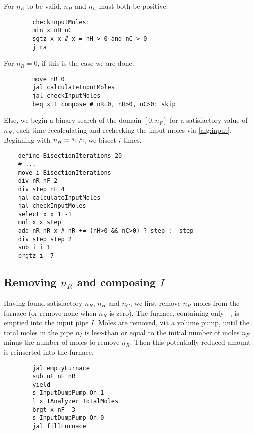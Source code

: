 \documentclass{article}
\DeclareMathOperator{\CDiox}{\mathrm{CO}_2}
\begin{document}
\begin{multicols}{2}
    \noindent
    For $n_R$ to be valid, $n_H$ and $n_C$ must both be positive.
    \columnbreak
    \begin{verbatim}
        checkInputMoles:
        min x nH nC
        sgtz x x # x = nH > 0 and nC > 0
        j ra
    \end{verbatim}
\end{multicols}
\begin{multicols}{2}
    \noindent
    For $n_R=0$, if this is the case we are done.
    \columnbreak
    \begin{verbatim}
        move nR 0
        jal calculateInputMoles
        jal checkInputMoles
        beq x 1 compose # nR=0, nH>0, nC>0: skip
    \end{verbatim}
\end{multicols}
\noindent
Else, we begin a binary search of the domain $[0,n_F]$
for a satisfactory value of $n_R$, each time recalculating and rechecking the
input moles via \ref{alg:input}.
Beginning with $n_R=\sfrac{n_F}{2}$, we bisect $i$ times.
\begin{verbatim}
    define BisectionIterations 20
    # ...
    move i BisectionIterations
    div nR nF 2
    div step nF 4
    jal calculateInputMoles
    jal checkInputMoles
    select x x 1 -1
    mul x x step
    add nR nR x # nR += (nH>0 && nC>0) ? step : -step
    div step step 2
    sub i i 1
    brgtz i -7
\end{verbatim}

\subsection{Removing $n_R$ and composing $I$}\label{alg:composing}

\begin{multicols}{2}
    \raggedcolumns
    \noindent
    Having found satisfactory $n_R$, $n_H$ and $n_C$, we first remove $n_R$
    moles from the furnace (or remove none when $n_R$ is zero).
    The furnace, containing only $\CDiox$, is emptied into the input pipe $I$.
    Moles are removed, via a volume pump, until the total moles in the pipe
    $n_I$ is less-than or equal to the initial number of moles $n_F$ minus the
    number of moles to remove $n_R$. Then this potentially reduced amount is
    reinserted into the furnace.
    \columnbreak
    \begin{verbatim}
        jal emptyFurnace
        sub nF nF nR
        yield
        s InputDumpPump On 1
        l x IAnalyzer TotalMoles
        brgt x nF -3
        s InputDumpPump On 0
        jal fillFurnace
    \end{verbatim}
\end{multicols}
\end{document}
